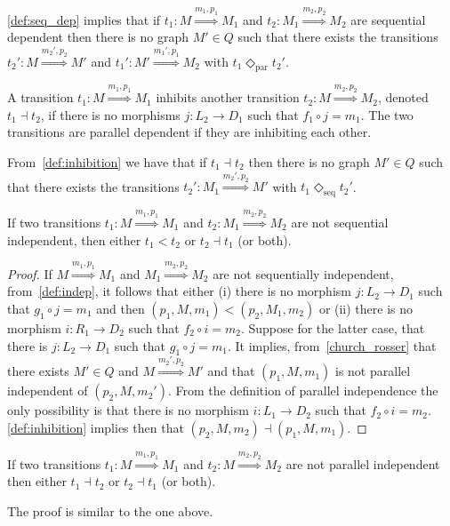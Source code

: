 \autoref{def:seq_dep} implies that if $t_1:M\overset{m_1,p_1}{\Rightarrow} M_1$ and $t_2:M_1\overset{m_2,p_2}{\Rightarrow} M_2$ are sequential dependent then there is no graph $M'\in Q$ such that there exists the transitions
$t_2':M\overset{m_2',p_2}{\Rightarrow} M'$ and $t_1':M'\overset{m_1',p_1}{\Rightarrow} M_2$ with $t_1\Diamond_{\text{par}}t_2'$.

\begin{definition}
  \label{def:inhibition}
  A transition $t_1:M\overset{m_1,p_1}{\Rightarrow} M_1$ inhibits another transition $t_2:M\overset{m_2,p_2}{\Rightarrow} M_2$, denoted $t_1 \dashv t_2$, if there is no morphisms $j:L_2\to D_1$ such that $f_1\circ j= m_1$. The two transitions are parallel dependent if they are inhibiting each other.
\end{definition}

From~\autoref{def:inhibition} we have that if $t_1 \dashv t_2$ then there is no graph $M'\in Q$ such that there exists the transitions $t_2':M_1\overset{m_2',p_2}{\Rightarrow} M'$ with $t_1\Diamond_{\text{seq}}t_2'$.

\begin{lemma}
  If two transitions $t_1:M\overset{m_1,p_1}{\Rightarrow} M_1$ and $t_2: M_1\overset{m_2,p_2}{\Rightarrow} M_2$ are not sequential independent, then either $t_1 < t_2$ or $t_2\dashv t_1$ (or both).
\end{lemma}
\begin{proof}
  If $M\overset{m_1,p_1}{\Rightarrow} M_1$ and $M_1\overset{m_2,p_2}{\Rightarrow} M_2$ are not sequentially independent, from~\autoref{def:indep}, it follows that either (i) there is no morphism $j:L_2\to D_1$ such that $g_1\circ j= m_1$ and then $(p_1,M,m_1) < (p_2,M_1,m_2)$ or (ii)
there is no morphism $i:R_1\to D_2$ such that $f_2\circ i= m_2$. Suppose for the latter case, that there is $j:L_2\to D_1$ such that $g_1\circ j= m_1$. It implies, from~\autoref{church_rosser} that there exists $M'\in Q$ and $M\overset{m_2',p_2}{\Rightarrow} M'$ and that $(p_1,M,m_1)$ is not parallel independent of $(p_2,M,m_2')$. From the definition of parallel independence the only possibility is that there is no morphism $i:L_1\to D_2$ such that $f_2\circ i= m_2$. \autoref{def:inhibition} implies then that $(p_2,M,m_2)\dashv(p_1,M,m_1)$.
\end{proof}

\begin{lemma}
  If two transitions $t_1:M\overset{m_1,p_1}{\Rightarrow} M_1$ and $t_2:M\overset{m_2,p_2}{\Rightarrow} M_2$ are not parallel independent then either $t_1\dashv t_2$ or $t_2\dashv t_1$ (or both).
\end{lemma}
The proof is similar to the one above.
